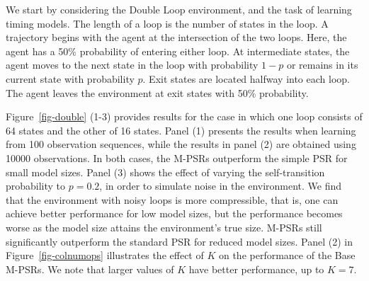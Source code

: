 \documentclass[letterpaper]{article}
\begin{document}
We start by considering the Double Loop environment, and the task of learning timing models. The length of a loop is the number of states in the loop. A trajectory begins with the agent at the intersection of the two loops. Here, the agent has a 50\% probability of entering either loop. At intermediate states, the agent moves to the next state in the loop with probability $1-p$ or remains in its current state with probability $p$. Exit states are located halfway into each loop. The agent leaves the environment at exit states with 50\% probability. 

Figure~\ref{fig-double} (1-3) provides results for the case in which one loop consists of 64 states and the other of 16 states. Panel (1) presents the results when learning from  100 observation sequences, while the results in panel (2) are obtained using 10000 observations. In both cases, the M-PSRs outperform the simple PSR for small model sizes. Panel (3) shows the effect of varying the self-transition probability to $p = 0.2$, in order to simulate noise in the environment. We find that the environment with noisy loops is more compressible, that is, one can achieve better performance for low model sizes, but the performance becomes worse as the model size attains the environment's true size. M-PSRs still significantly outperform the standard PSR for reduced model sizes. Panel (2) in Figure~\ref{fig-colnumops} illustrates the effect of $K$ on the performance of the Base M-PSRs. We note that larger values of $K$ have better performance, up to $K=7$.
\end{document}
